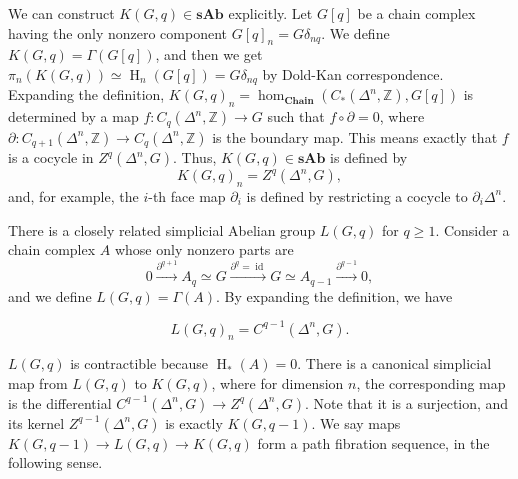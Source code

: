 \documentclass[reprint, amsmath, amssymb, showpacs, floatfix, longbibliography, aps, twocolumn, superscriptaddress, nofootinbib]{revtex4-2}
\newcommand{\ZZ}{{\mathbb Z}}
\theoremstyle{definition}
\begin{document}
We can construct $K(G,q)\in \mathbf{sAb}$ explicitly. Let $G[q]$ be a chain complex having the only nonzero component $G[q]_n=G\delta_{nq}$. We define $K(G,q)=\Gamma(G[q])$, and then we get $\pi_n(K(G,q))\simeq \operatorname{H}_n(G[q])=G\delta_{nq}$ by Dold-Kan correspondence. Expanding the definition, $K(G,q)_n=\hom_{\mathbf{Chain}}(C_*(\Delta^n,\ZZ),G[q])$ is determined by a map $f:C_q(\Delta^n,\ZZ)\rightarrow G$ such that $f\circ \partial=0$, where $\partial:C_{q+1}(\Delta^n,\ZZ)\rightarrow C_q(\Delta^n,\ZZ)$ is the boundary map. This means exactly that $f$ is a cocycle in $Z^q(\Delta^n,G)$. Thus, $K(G,q)\in \mathbf{sAb}$ is defined by
\begin{equation}
	K(G,q)_n=Z^q(\Delta^n,G),
\end{equation}
and, for example, the $i$-th face map $\partial_i$ is defined by restricting a cocycle to $\partial_i\Delta^n$.

There is a closely related simplicial Abelian group $L(G,q)$ for $q\ge 1$. Consider a chain complex $A$ whose only nonzero parts are
\begin{equation}\label{eqL(G,q)ChainChainComplex}
	0\xrightarrow{\partial^{q+1}} A_q\simeq G\xrightarrow{\partial^q=\operatorname{id}}G\simeq A_{q-1}\xrightarrow{\partial^{q-1}} 0,
\end{equation}
and we define $L(G,q)=\Gamma(A)$. By expanding the definition, we have

\begin{equation}
	L(G,q)_n=C^{q-1}(\Delta^n,G).
\end{equation}

$L(G,q)$ is contractible because $\operatorname{H}_*(A)=0$. There is a canonical simplicial map from $L(G,q)$ to $K(G,q)$, where for dimension $n$, the corresponding map is the differential $C^{q-1}(\Delta^n,G)\rightarrow Z^q(\Delta^n,G)$. Note that it is a surjection, and its kernel $Z^{q-1}(\Delta^n,G)$ is exactly $K(G,q-1)$. We say maps $K(G,q-1)\rightarrow L(G,q)\rightarrow K(G,q)$ form a path fibration sequence, in the following sense.
\end{document}
